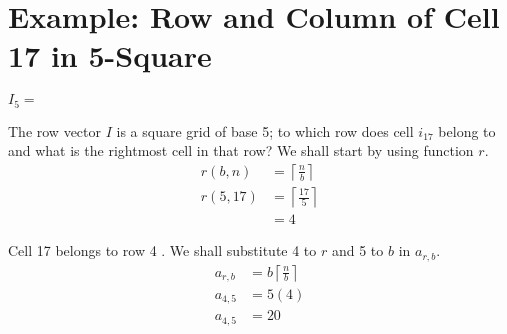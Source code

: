 \documentclass[letterpaper, twoside,12pt]{book}
\begin{document}
    \section{Example: Row and Column of Cell 17 in 5-Square}
    \label{1_example_1}
    \begin{figure*}[ht]
        \centering
        \setcounter{MaxMatrixCols}{25}
            \centering
            $I_5 =$
    \end{figure*}

    The row vector $I$ is a square grid of base 5; to which row does cell $i_{17}$ belong to and what is the rightmost cell in that row? We shall start by using function $r$.
    \begin{equation*}
        \begin{split}
            r(b,n) &= \left\lceil \frac{n}{b} \right\rceil \\
            r(5,17) &= \left\lceil \frac{17}{5} \right\rceil \\
                &= 4
        \end{split}
    \end{equation*}

    Cell 17 belongs to row 4 . We shall substitute 4 to $r$ and 5 to $b$ in $a_{r,b}$.
    \begin{equation*}
        \begin{split}
            a_{r,b} &= b\left\lceil \frac{n}{b} \right\rceil \\
            a_{4,5} &= 5(4) \\
            a_{4,5} &= 20 \\
        \end{split}
    \end{equation*}
\end{document}
